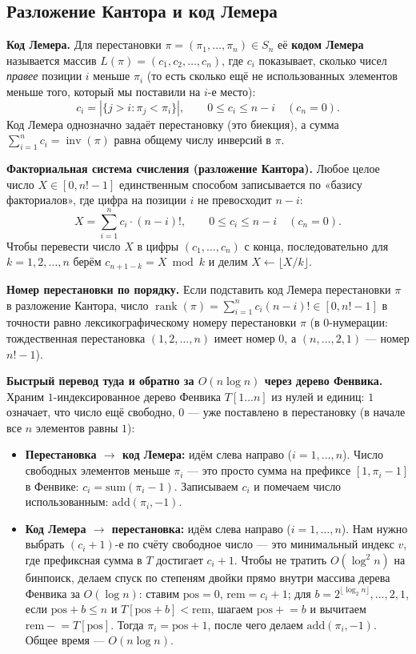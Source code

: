 \documentclass[10pt,a4paper]{article}
\renewcommand{\le}{\leqslant}
\DeclareMathOperator{\rk}{rank}
\DeclareMathOperator{\inv}{inv}
\begin{document}
\subsection{Разложение Кантора и код Лемера}

\textbf{Код Лемера.} Для перестановки $\pi = (\pi_1, \dots, \pi_n) \in S_n$ её \textbf{кодом Лемера} называется массив $L(\pi) = (c_1, c_2, \dots, c_n)$, где $c_i$ показывает, сколько чисел \emph{правее} позиции $i$ меньше $\pi_i$ (то есть сколько ещё не использованных элементов меньше того, который мы поставили на $i$-е место):
\[
  c_i = |\{j > i : \pi_j < \pi_i\}|, \qquad 0 \le c_i \le n - i \quad (c_n = 0).
\]
Код Лемера однозначно задаёт перестановку (это биекция), а сумма $\sum_{i=1}^n c_i = \inv(\pi)$ равна общему числу инверсий в $\pi$.

\textbf{Факториальная система счисления (разложение Кантора).} Любое целое число $X \in [0, n! - 1]$ единственным способом записывается по «базису факториалов», где цифра на позиции $i$ не превосходит $n - i$:
\[
  X = \sum_{i=1}^{n} c_i \cdot (n - i)!, \qquad 0 \le c_i \le n - i \quad (c_n = 0).
\]
Чтобы перевести число $X$ в цифры $(c_1, \dots, c_n)$ с конца, последовательно для $k = 1, 2, \dots, n$ берём $c_{n + 1 - k} = X \bmod k$ и делим $X \leftarrow \lfloor X / k \rfloor$.

\textbf{Номер перестановки по порядку.} Если подставить код Лемера перестановки $\pi$ в разложение Кантора, число $\rk(\pi) = \sum_{i=1}^n c_i (n - i)! \in [0, n! - 1]$ в точности равно лексикографическому номеру перестановки $\pi$ (в $0$-нумерации: тождественная перестановка $(1, 2, \dots, n)$ имеет номер $0$, а $(n, \dots, 2, 1)$ — номер $n! - 1$).

\textbf{Быстрый перевод туда и обратно за $O(n \log n)$ через дерево Фенвика.} Храним $1$-индексированное дерево Фенвика $T[1 \dots n]$ из нулей и единиц: $1$ означает, что число ещё свободно, $0$ — уже поставлено в перестановку (в начале все $n$ элементов равны $1$):
\begin{itemize}
  \item \textbf{Перестановка $\to$ код Лемера:} идём слева направо ($i = 1, \dots, n$). Число свободных элементов меньше $\pi_i$ — это просто сумма на префиксе $[1, \pi_i - 1]$ в Фенвике: $c_i = \mathrm{sum}(\pi_i - 1)$. Записываем $c_i$ и помечаем число использованным: $\mathrm{add}(\pi_i, -1)$.
  \item \textbf{Код Лемера $\to$ перестановка:} идём слева направо ($i = 1, \dots, n$). Нам нужно выбрать $(c_i + 1)$-е по счёту свободное число — это минимальный индекс $v$, где префиксная сумма в $T$ достигает $c_i + 1$. Чтобы не тратить $O(\log^2 n)$ на бинпоиск, делаем спуск по степеням двойки прямо внутри массива дерева Фенвика за $O(\log n)$: ставим $\mathrm{pos} = 0$, $\mathrm{rem} = c_i + 1$; для $b = 2^{\lfloor \log_2 n \rfloor}, \dots, 2, 1$, если $\mathrm{pos} + b \le n$ и $T[\mathrm{pos} + b] < \mathrm{rem}$, шагаем $\mathrm{pos} \mathrel{+}= b$ и вычитаем $\mathrm{rem} \mathrel{-}= T[\mathrm{pos}]$. Тогда $\pi_i = \mathrm{pos} + 1$, после чего делаем $\mathrm{add}(\pi_i, -1)$. Общее время — $O(n \log n)$.
\end{itemize}
\end{document}
